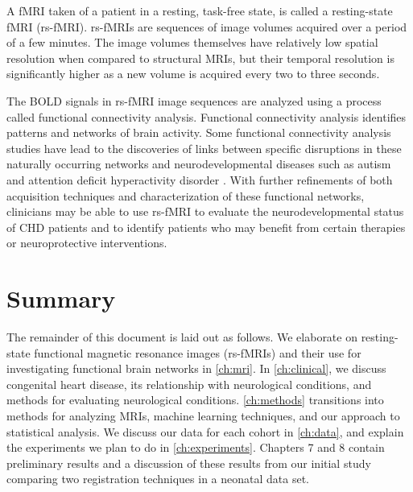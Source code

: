 A fMRI taken of a patient in a resting, task-free state, is called a resting-state fMRI (rs-fMRI). rs-fMRIs are sequences of image volumes acquired over a period of a few minutes. The image volumes themselves have relatively low spatial resolution when compared to structural MRIs, but their temporal resolution is significantly higher as a new volume is acquired every two to three seconds. 

The BOLD signals in rs-fMRI image sequences are analyzed using a process called functional connectivity analysis. Functional connectivity analysis identifies patterns and networks of brain activity. Some functional connectivity analysis studies have lead to the discoveries of links between specific disruptions in these naturally occurring networks and neurodevelopmental diseases such as autism and attention deficit hyperactivity disorder \cite{Assaf2010} \cite{Zang2007}. With further refinements of both acquisition techniques and characterization of these functional networks, clinicians may be able to use rs-fMRI to evaluate the neurodevelopmental status of CHD patients and to identify patients who may benefit from certain therapies or neuroprotective interventions.

\section{Summary}


The remainder of this document is laid out as follows. We elaborate on resting-state functional magnetic resonance images (rs-fMRIs) and their use for investigating functional brain networks in \autoref{ch:mri}. In \autoref{ch:clinical}, we discuss congenital heart disease, its relationship with neurological conditions, and methods for evaluating neurological conditions. \autoref{ch:methods} transitions into methods for analyzing MRIs, machine learning techniques, and our approach to statistical analysis. We discuss our data for each cohort in \autoref{ch:data}, and explain the experiments we plan to do in \autoref{ch:experiments}. 
Chapters 7 and 8 contain preliminary results and a discussion of these results from our initial study comparing two registration techniques in a neonatal data set.